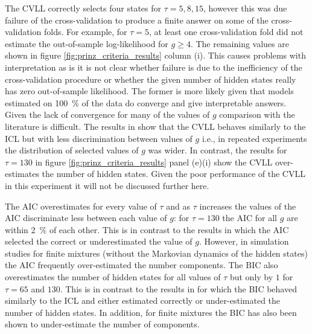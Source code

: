The CVLL correctly selects four states for $\tau = 5, 8, 15$, however this was due failure of the cross-validation to produce a finite answer on some of the cross-validation folds. For example, for $\tau=5$, at least one cross-validation fold did not estimate the out-of-sample log-likelihood for $g\ge 4$. The remaining values are shown in figure \ref{fig:prinz_criteria_results} column (i). This causes problems with interpretation as is it is not clear whether failure is due to the  inefficiency of the cross-validation procedure or whether the given number of hidden states really has zero out-of-sample likelihood. The former is more likely given that models estimated on \SI{100}{\percent} of the data do converge and give interpretable answers. Given the lack of convergence for many of the values of $g$ comparison with the literature is difficult. The results in \cite{celeuxSelectingHiddenMarkov2008} show that the CVLL behaves similarly to the ICL but with less discrimination between values of $g$ i.e., in repeated experiments the distribution of selected values of $g$ was wider. In contrast, the results for $\tau=130$ in figure \ref{fig:prinz_criteria_results} panel (e)(i) show the CVLL over-estimates the number of hidden states.  Given the poor performance of the CVLL in this experiment it will not be discussed further here. 

The AIC overestimates for every value of $\tau$ and as $\tau$ increases the values of the AIC discriminate less between each value of $g$: for $\tau = 130$ the AIC for all $g$ are within \SI{2}{\percent} of each other. This is in contrast to the results in   \cite{celeuxSelectingHiddenMarkov2008} which the AIC selected the correct or underestimated the value of $g$. However, in simulation studies for finite mixtures (without the Markovian dynamics of the hidden states) the AIC frequently over-estimated the number components. \cite{celeuxEntropyCriterionAssessing1996, soromenho1994comparing} The BIC also overestimates the number of hidden states for all values of $\tau$ but only by $1$ for $\tau=65$ and $130$. This is in contrast to the results in \cite{celeuxSelectingHiddenMarkov2008} for which the BIC behaved similarly to the ICL and either estimated correctly or under-estimated the number of hidden states.  In addition, for finite mixtures the BIC has also been shown to under-estimate the number of components.\cite{biernackiAssessingMixtureModel2000a} 

